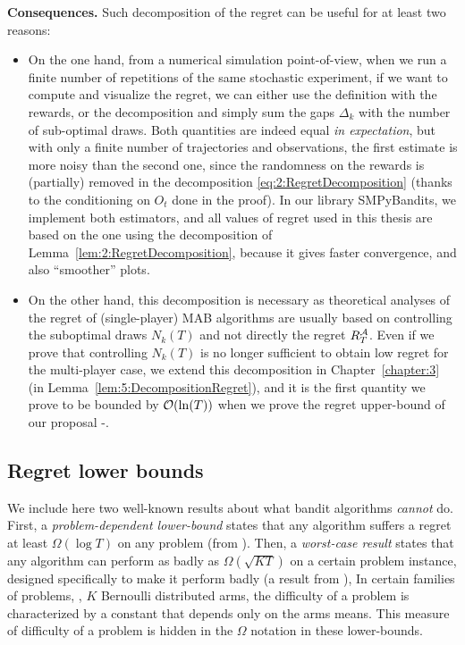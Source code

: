 \textbf{Consequences.}
%
Such decomposition of the regret can be useful for at least two reasons:

\begin{itemize}
    \item
On the one hand, from a numerical simulation point-of-view, when we run a finite number of repetitions of the same stochastic experiment, if we want to compute and visualize the regret, we can either use the definition with the rewards, or the decomposition and simply sum the gaps $\Delta_k$ with the number of sub-optimal draws.
Both quantities are indeed equal \emph{in expectation}, but with only a finite number of trajectories and observations, the first estimate is more noisy than the second one, since the randomness on the rewards is (partially) removed in the decomposition \eqref{eq:2:RegretDecomposition} (thanks to the conditioning on $O_t$ done in the proof).
In our library SMPyBandits, we implement both estimators, and all values of regret used in this thesis are based on the one using the decomposition of Lemma~\ref{lem:2:RegretDecomposition}, because it gives faster convergence, and also ``smoother'' plots.
\label{remark:2:moreAccurateCountofRegretForSimulations}

    \item
On the other hand, this decomposition is necessary as theoretical analyses of the regret of (single-player) MAB algorithms are usually based on controlling the suboptimal draws $N_k(T)$ and not directly the regret $R_T^{\mathcal{A}}$.
Even if we prove that controlling $N_k(T)$ is no longer sufficient to obtain low regret for the multi-player case, we extend this decomposition in Chapter~\ref{chapter:3} (in Lemma~\ref{lem:5:DecompositionRegret}), and it is the first quantity we prove to be bounded by $\mathop{}\mathopen{}\mathcal{O}\mathopen{}\left(\ln(T)\right)$ when we prove the regret upper-bound of our proposal \MCTopM-\klUCB.
\end{itemize}


\subsection{Regret lower bounds}

We include here two well-known results about what bandit algorithms \emph{cannot} do.
First, a \emph{problem-dependent lower-bound} states that any algorithm suffers a regret at least $\Omega(\log T)$ on any problem (from \cite{LaiRobbins85}).
Then, a \emph{worst-case result} states that any algorithm can perform as badly as $\Omega(\sqrt{K T})$ on a certain problem instance, designed specifically to make it perform badly (a result from \cite{Auer02NonStochastic}),
%
In certain families of problems, \eg, $K$ Bernoulli distributed arms, the difficulty of a problem is characterized by a constant that depends only on the arms means. This measure of difficulty of a problem is hidden in the $\Omega$ notation in these lower-bounds.

